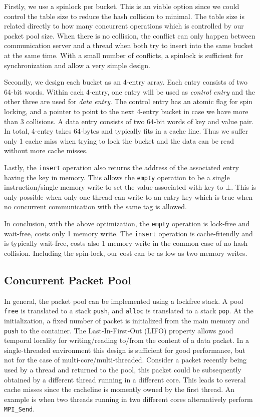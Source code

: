 Firstly, we use a spinlock per bucket. This is an viable option since we could
control the table size to reduce the hash collision to minimal. The table size is
related directly to how many concurrent operations which is controlled by 
our packet pool size. When there is no collision, the conflict can only happen
between communication server and a thread when both try to insert into the same
bucket at the same time. With a small number of conflicts, a spinlock is
sufficient for synchronization and allow a very simple design.

Secondly, we design each bucket as an 4-entry array. Each entry consists of two
64-bit words. Within each 4-entry, one entry will be used as \textit{control
entry} and the other three are used for \textit{data entry}. The control entry
has an atomic flag for spin locking, and a pointer to point to the next 4-entry
bucket in case we have more than 3 collisions. A data entry consists of two
64-bit words of key and value pair. In total, 4-entry takes 64-bytes and
typically fits in a cache line. Thus we suffer only 1 cache miss when trying to
lock the bucket and the data can be read without more cache misses.

Lastly, the \texttt{insert} operation also returns the address of the
associated entry having the key in memory. This allows the \texttt{empty}
operation to be a single instruction/single memory write to set the value
associated with key to $\bot$. This is only possible when only one thread can
write to an entry key which is true when no concurrent communication with the
same tag is allowed.

In conclusion, with the above optimization, the \texttt{empty} operation is
lock-free and wait-free, costs only 1 memory write. The \texttt{insert}
operation is cache-friendly and is typically wait-free, costs also 1 memory
write in the common case of no hash collision. Including the spin-lock,
our cost can be as low as two memory writes.

\subsection{Concurrent Packet Pool}
In general, the packet pool can be implemented using a lockfree stack. A pool
\texttt{free} is translated to a stack \texttt{push}, and \texttt{alloc} is
translated to a stack \texttt{pop}. At the initialization, a fixed number of
packet is initialized from the main memory and \texttt{push} to the container.
The Last-In-First-Out (LIFO) property allows good temporal locality for
writing/reading to/from the content of a data packet. In a single-threaded
environment this design is sufficient for good performance, but not for the
case of multi-core/multi-threaded. Consider a packet recently being used by a thread
and returned to the pool, this packet could be subsequently obtained by a different thread
running in a different core. This leads to several cache misses since the cacheline
is momently owned by the first thread. An example is when two threads running in 
two different cores alternatively perform \texttt{MPI_Send}.

